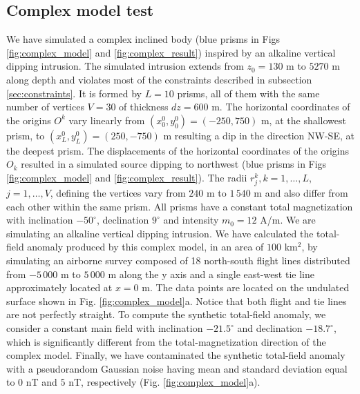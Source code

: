 \subsection{Complex model test}

We have simulated a complex inclined body (blue prisms in Figs \ref{fig:complex_model} and \ref{fig:complex_result}) inspired by an alkaline vertical dipping intrusion. The simulated intrusion extends from $z_0=130$ m to $5270$ m along depth and violates most of the constraints described in subsection \ref{sec:constraints}. It is formed by $ L = 10 $ prisms, all of them with the same number of vertices $ V = 30 $ of thickness $ dz = 600 $ m. The horizontal coordinates of the origins $ O^k $ vary linearly from $ (x_0^0, y_0^0) = (-250, 750) $ m, at the shallowest prism, to $ (x_L^0, y_L^0) = (250, -750) $ m resulting a dip in the direction NW-SE, at the deepest prism. The displacements of the horizontal coordinates of the origins $O_k$ resulted in a simulated source dipping to northwest (blue prisms in Figs \ref{fig:complex_model} and \ref{fig:complex_result}). The radii $ r^k_j, k = 1, \dots, L$, $j = 1,\dots, V$, defining the vertices vary from $ 240 $ m to $ 1\,540 $ m and also differ from each other within the same prism. All prisms have a constant total magnetization with inclination $ -50^\circ $, declination $ 9^\circ $ and intensity $ m_0 = 12 $ A/m. We are simulating an alkaline vertical dipping intrusion. We have calculated the total-field anomaly produced by this complex model, in an area of $ 100 $ km$^2 $, by simulating an airborne survey composed of 18 north-south flight lines distributed from $ -5\,000 $ m to $ 5\,000 $ m along the y axis and a single east-west tie line approximately located at $ x = 0 $ m. The data points are located on the undulated surface shown in Fig. \ref{fig:complex_model}a. Notice that both flight and tie lines are not perfectly straight. To compute the synthetic total-field anomaly, we consider a constant main field with inclination $ -21.5^\circ $ and declination $ -18.7^\circ $, which is significantly different from the total-magnetization direction of the complex model. Finally, we have
contaminated the synthetic total-field anomaly with a pseudorandom Gaussian noise having mean and standard deviation equal to $0$ nT and $5$ nT, respectively (Fig. \ref{fig:complex_model}a).

